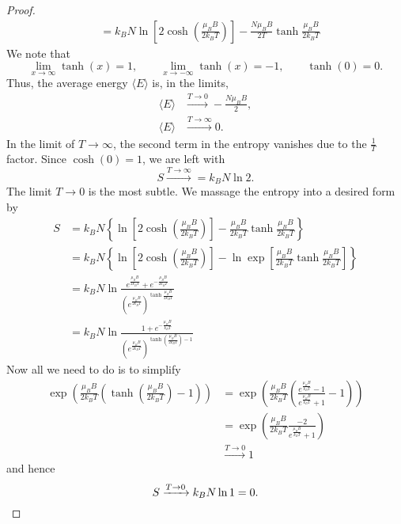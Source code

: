 \begin{proof}
\begin{align*}
		  &= k_B N \ln\left[ 2\cosh \left( \frac{\mu_B B}{2k_B T} \right)  \right]-\frac{N\mu_B B}{2T}\tanh \frac{\mu_B B}{2k_B T}  
	\end{align*}
	We note that
	\[
	\lim_{x \to \infty} \tanh(x) = 1, \qquad \lim_{x \to -\infty} \tanh(x) = -1,\qquad\tanh(0)=0
	.\] 
	Thus, the average energy $\langle E\rangle$ is, in the limits,
	\begin{align*}
		\langle E \rangle &\xrightarrow{T\to 0} -\frac{N\mu_B B}{2},\\
		\langle E\rangle &\xrightarrow{T\to \infty}0.
	\end{align*}
	In the limit of $T\to \infty$, the second term in the entropy vanishes due to the $\frac{1}{T}$factor. Since $\cosh(0)=1$, we are left with
	\[
		S\xrightarrow{T\to \infty} = k_B N \ln 2
	.\] 
	The limit $T\to 0$ is the most subtle. We massage the entropy into a desired form by
	\begin{align*}
		S &= k_B N \left\{ \ln \left[ 2\cosh \left( \frac{\mu_B B}{2k_B T} \right)  \right] - \frac{\mu_B B}{2k_B T}\tanh \frac{\mu_B B}{2k_B T} \right\}  \\
		  &= k_B N \left\{ \ln \left[ 2\cosh \left( \frac{\mu_B B}{2k_B T} \right)  \right] - \ln \exp\left[\frac{\mu_B B}{2k_B T}\tanh \frac{\mu_B B}{2k_B T}\right] \right\}  \\
		  &= k_B N \ln \frac{e^{\frac{\mu_B B}{2k_BT}}+e^{-\frac{\mu_B B}{2k_B T}}}{\left(e^{\frac{\mu_B B}{2k_B T}}\right)^{\tanh \frac{\mu_B B}{2k_B T}}} \\
		  &= k_B N \ln \frac{1+e^{-\frac{\mu_B B}{k_B T}}}{\left(e^{\frac{\mu_B B}{2k_B T}}\right)^{\tanh \left(\frac{\mu_B B}{2k_B T}\right)-1}} 
	\end{align*}
	Now all we need to do is to simplify
	\begin{align*}
		\exp\left( \frac{\mu_B B}{2k_B T}\left( \tanh \left(\frac{\mu_B B}{2k_B T}\right)-1 \right)  \right) &= \exp\left( \frac{\mu_B B}{2k_B T}\left( \frac{e^{\frac{\mu_B B}{k_B T}}-1}{e^{\frac{\mu_B B}{k_B T}}+1}-1 \right)  \right)\\ 
														     &=\exp\left( \frac{\mu_B B}{2k_B T} \frac{-2}{e^{\frac{\mu_B B}{k_B T}}+1}  \right)\\
														     &\xrightarrow{T\to 0} 1
	\end{align*}
	and hence
	\[
		S \xrightarrow{T\to 0} k_B N \ln 1 = 0
	.\qedhere\] 
\end{proof}
